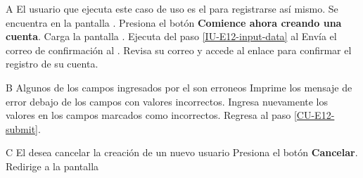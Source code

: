 \begin{UCtrayectoriaA}{A}{%
El usuario que ejecuta este caso de uso es el  para registrarse
así mismo.
}
  \Actor Se encuentra en la pantalla . 
  \Actor Presiona el botón {\bf Comience ahora creando una cuenta}.
  \Sistema Carga la pantalla .
  \Sistema Ejecuta del paso \ref{IU-E12-input-data} al
  \Sistema Envía el correo de confirmación al . 
  \Actor Revisa su correo y accede al enlace para confirmar el registro de su cuenta.
\end{UCtrayectoriaA}

\begin{UCtrayectoriaA}{B}{%
Algunos de los campos ingresados por el  son erroneos
}
  \Sistema Imprime los mensaje de error debajo de los campos con valores incorrectos.
  \Actor Ingresa nuevamente los valores en los campos marcados como incorrectos.
  \Sistema Regresa al paso \ref{CU-E12-submit}.
\end{UCtrayectoriaA}


\begin{UCtrayectoriaA}{C}{%
El  desea cancelar la creación de un nuevo usuario
}
  \Actor Presiona el botón {\bf Cancelar}.
  \Sistema Redirige a la pantalla 
\end{UCtrayectoriaA}

